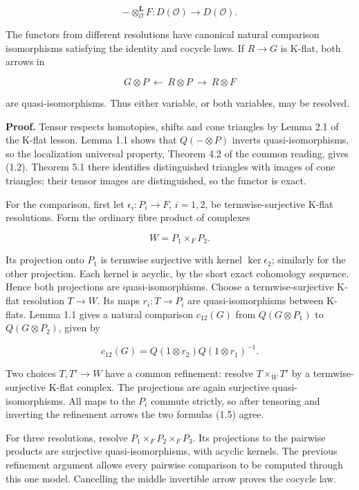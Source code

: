 \documentclass[
  english,
  11pt,
  a4paper,
]{article}
\begin{document}
\[-\otimes_{\mathcal O}^{\mathbf L}F:D(\mathcal O)\longrightarrow D(\mathcal O).
\tag{1.2}\]

The functors from different resolutions have canonical natural
comparison isomorphisms satisfying the identity and cocycle laws. If
\(R\to G\) is K-flat, both arrows in

\[G\otimes P\ \longleftarrow\ R\otimes P\ \longrightarrow\ R\otimes F
\tag{1.3}\]

are quasi-isomorphisms. Thus either variable, or both variables, may be
resolved.

\textbf{Proof.} Tensor respects homotopies, shifts and cone triangles by
Lemma 2.1 of the K-flat lesson. Lemma 1.1 shows that \(Q(-\otimes P)\)
inverts quasi-isomorphisms, so the localization universal property,
Theorem 4.2 of the common reading, gives (1.2). Theorem 5.1 there
identifies distinguished triangles with images of cone triangles; their
tensor images are distinguished, so the functor is exact.

For the comparison, first let \(\epsilon_i:P_i\to F\), \(i=1,2\), be
termwise-surjective K-flat resolutions. Form the ordinary fibre product
of complexes

\[W=P_1\times_F P_2.
\tag{1.4}\]

Its projection onto \(P_1\) is termwise surjective with kernel
\(\ker\epsilon_2\); similarly for the other projection. Each kernel is
acyclic, by the short exact cohomology sequence. Hence both projections
are quasi-isomorphisms. Choose a termwise-surjective K-flat resolution
\(T\to W\). Its maps \(r_i:T\to P_i\) are quasi-isomorphisms between
K-flats. Lemma 1.1 gives a natural comparison \(c_{12}(G)\) from
\(Q(G\otimes P_1)\) to \(Q(G\otimes P_2)\), given by

\[c_{12}(G)=Q(1\otimes r_2)Q(1\otimes r_1)^{-1}.
\tag{1.5}\]

Two choices \(T,T'\to W\) have a common refinement: resolve
\(T\times_W T'\) by a termwise-surjective K-flat complex. The
projections are again surjective quasi-isomorphisms. All maps to the
\(P_i\) commute strictly, so after tensoring and inverting the
refinement arrows the two formulas (1.5) agree.

For three resolutions, resolve \(P_1\times_F P_2\times_F P_3\). Its
projections to the pairwise products are surjective quasi-isomorphisms,
with acyclic kernels. The previous refinement argument allows every
pairwise comparison to be computed through this one model. Cancelling
the middle invertible arrow proves the cocycle law.
\end{document}
